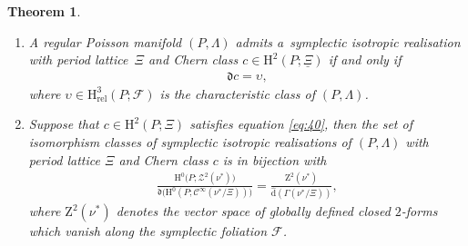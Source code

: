 \documentclass[10pt,a4paper]{amsart}
\numberwithin{equation}{section}
\newtheorem{Theorem}{Theorem}[section]
\newcommand{\de}{\mathrm{d}} %
\newcommand{\PM}{(P,\Lambda)} %
\newcommand{\HH}{\mathrm{H}}
\begin{document}
\begin{Theorem}\label{thm:real_sirs}\quad
 \begin{enumerate}[label={\rm \arabic*.}, ref={\rm (\arabic*)}]\itemsep=0pt
\item \label{item:16} A regular Poisson manifold $\PM$ admits a~symplectic isotropic realisation with period lattice~$\Xi$ and Chern class $c \in \HH^2(P;\underline{\Xi})$ if and only if
 \begin{gather} \label{eq:40}
 \mathfrak{d}c = \upsilon,
 \end{gather}
 where $ \upsilon \in \HH_{\mathrm{rel}}^3(P;\mathcal{F})$ is the characteristic class of $\PM$.
 \item \label{item:17} Suppose that $c \in \HH^2(P;\Xi)$ satisfies equation \eqref{eq:40}, then the set of isomorphism classes of symplectic isotropic realisations of $\PM$ with period lattice $\Xi$ and Chern class $c$ is in bijection with
 \begin{gather*}
 \frac{\HH^0\big(P; \mathcal{Z}^2(\nu^*)\big)}{\mathfrak{d} \big(\HH^0 (P;\mathcal{C}^{\infty}(\nu^*/\Xi)
 )\big)} = \frac{\mathrm{Z}^2(\nu^*)}{\hat{\de}(\Gamma(\nu^*/\Xi))},
 \end{gather*}
 where $\mathrm{Z}^2(\nu^*)$ denotes the vector space of globally defined closed $2$-forms which vanish along the symplectic foliation $\mathcal{F}$.
 \end{enumerate}
\end{Theorem}
\end{document}
